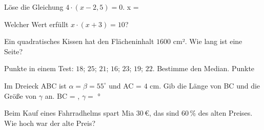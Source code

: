 \documentclass[11pt]{article}
\begin{document}
\noindent\begin{minipage}[t]{0.485\linewidth}\raggedright
\begin{aufgabe}{Löse die Gleichung $4 \cdot (x - 2{,}5) = 0$. x = \leerfeld}
\end{aufgabe}
\end{minipage}\hfill\begin{minipage}[t]{0.485\linewidth}\raggedright
\begin{aufgabe}{Welcher Wert erfüllt $x \cdot (x + 3) = 10$? \\    }
\end{aufgabe}
\end{minipage}\par

\noindent\begin{minipage}[t]{0.485\linewidth}\raggedright
\begin{aufgabe}{Ein quadratisches Kissen hat den Flächeninhalt $1600$ cm². Wie lang ist eine Seite? \leerfeld[cm]}
\end{aufgabe}
\end{minipage}\hfill\begin{minipage}[t]{0.485\linewidth}\raggedright
\begin{aufgabe}{Punkte in einem Test: $18$; $25$; $21$; $16$; $23$; $19$; $22$. Bestimme den Median. \leerfeld Punkte}
\end{aufgabe}
\end{minipage}\par

\begin{aufgabe}{Im Dreieck ABC ist $\alpha = \beta = 55^\circ$ und AC = $4$ cm. Gib die Länge von BC und die Größe von $\gamma$ an. BC = \leerfeld[cm] , $\gamma =$ \leerfeld °}
\end{aufgabe}

\begin{aufgabe}{Beim Kauf eines Fahrradhelms spart Mia $30\,€$, das sind $60\,\%$ des alten Preises. Wie hoch war der alte Preis? \leerfeld[€]}
\end{aufgabe}
\end{document}
